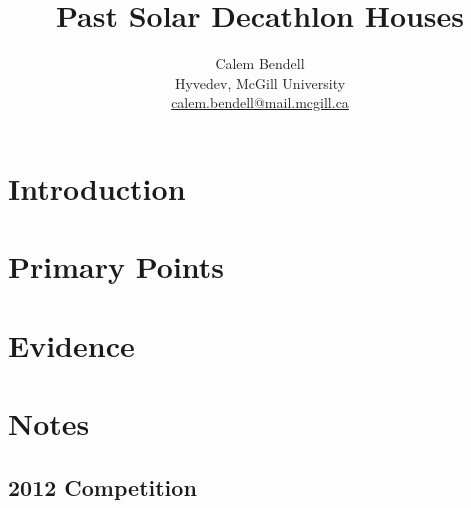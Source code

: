 

\title{Past Solar Decathlon Houses}
\author{
\normalsize
{ Calem Bendell } \\
Hyvedev, McGill University \\
\href{mailto:calem.bendell@mail.mcgill.ca}{calem.bendell@mail.mcgill.ca}
}
\date{}



\section{Introduction}

\section{Primary Points}

\section{Evidence}

\section{Notes}

	\subsection{2012 Competition}
	
